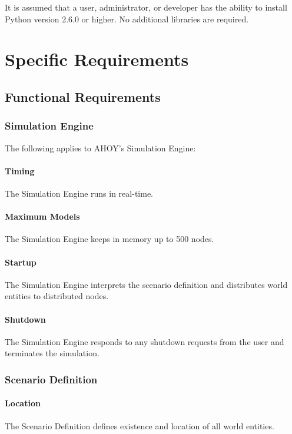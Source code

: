 \documentclass[titlepage]{article}
\begin{document}
It is assumed that a user, administrator, or developer has the ability to install Python version 2.6.0 or higher.  No additional libraries are required.


\section{Specific Requirements%
  \label{specific-requirements}%
}

\subsection{Functional Requirements%
    \label{functional}%
}

\subsubsection{Simulation Engine}
	The following applies to AHOY's Simulation Engine:
    \paragraph{Timing} The Simulation Engine runs in real-time.
    \paragraph{Maximum Models} The Simulation Engine keeps in memory up to 500 nodes.
    \paragraph{Startup} The Simulation Engine interprets the scenario definition and distributes world entities to distributed nodes.
    \paragraph{Shutdown} The Simulation Engine responds to any shutdown requests from the user and terminates the simulation.

\subsubsection{Scenario Definition}
	\paragraph{Location} The Scenario Definition defines existence and location of all world entities.
\end{document}
